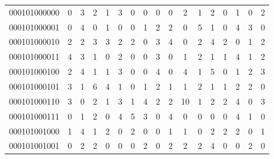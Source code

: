 \documentclass[10pt,a4paper]{article}
\begin{document}
\begin{longtable}{ |c|c|c|c|c|c|c|c|c|c|c|c|c|c|c|c|c| }
    000101000000              & 0                            & 3                                & 2                            & 1                              & 3   & 0   & 0   & 0   & 0   & 2   & 1   & 2   & 0   & 1   & 0   & 2   \\
    000101000001              & 0                            & 4                                & 0                            & 1                              & 0   & 0   & 1   & 2   & 2   & 0   & 5   & 1   & 0   & 4   & 3   & 0   \\
    000101000010              & 2                            & 2                                & 3                            & 3                              & 2   & 2   & 0   & 3   & 4   & 0   & 2   & 4   & 2   & 0   & 1   & 2   \\
    000101000011              & 4                            & 3                                & 1                            & 0                              & 2   & 0   & 0   & 3   & 0   & 1   & 2   & 1   & 1   & 4   & 1   & 2   \\
    000101000100              & 2                            & 4                                & 1                            & 1                              & 3   & 0   & 0   & 4   & 0   & 4   & 1   & 5   & 0   & 1   & 2   & 3   \\
    000101000101              & 3                            & 1                                & 6                            & 4                              & 1   & 0   & 1   & 2   & 1   & 1   & 2   & 1   & 1   & 2   & 2   & 0   \\
    000101000110              & 3                            & 0                                & 2                            & 1                              & 3   & 1   & 4   & 2   & 2   & 10  & 1   & 2   & 2   & 4   & 0   & 3   \\
    000101000111              & 0                            & 1                                & 2                            & 0                              & 4   & 5   & 3   & 0   & 4   & 0   & 0   & 0   & 0   & 4   & 1   & 0   \\
    000101001000              & 1                            & 4                                & 1                            & 2                              & 0   & 2   & 0   & 0   & 1   & 1   & 0   & 2   & 2   & 2   & 0   & 1   \\
    000101001001              & 0                            & 2                                & 2                            & 0                              & 0   & 0   & 2   & 0   & 2   & 2   & 2   & 4   & 0   & 0   & 2   & 0   \\

\end{longtable}
\end{document}
